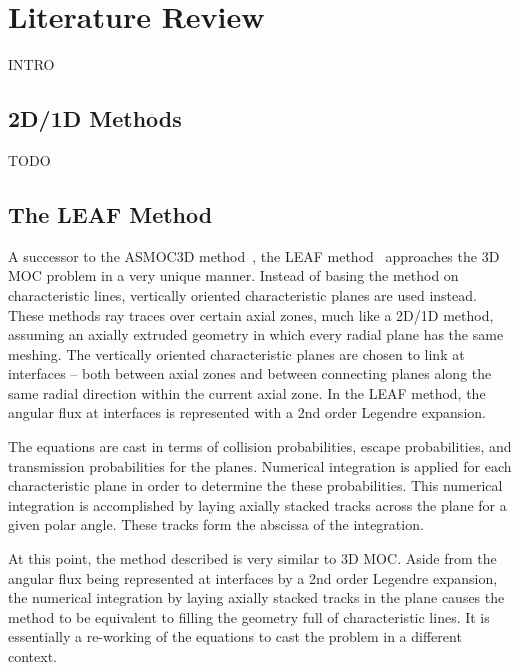 \chapter{Literature Review}
\label{chap:literature-review}

INTRO

\section{2D/1D Methods}
\label{sec:2d_1d}
TODO

\section{The LEAF Method}
\label{sec:leaf}

A successor to the ASMOC3D method~\cite{pre_leaf}, the LEAF method~\cite{leaf_init, leaf_method} approaches the 3D \ac{MOC} problem in a very unique manner. Instead of basing the method on characteristic lines, vertically oriented characteristic planes are used instead. These methods ray traces over certain axial zones, much like a 2D/1D method, assuming an axially extruded geometry in which every radial plane has the same meshing. The vertically oriented characteristic planes are chosen to link at interfaces -- both between axial zones and between connecting planes along the same radial direction within the current axial zone. In the LEAF method, the angular flux at interfaces is represented with a 2nd order Legendre expansion.

The equations are cast in terms of collision probabilities, escape probabilities, and transmission probabilities for the planes. Numerical integration is applied for each characteristic plane in order to determine the these probabilities. This numerical integration is accomplished by laying axially stacked tracks across the plane for a given polar angle. These tracks form the abscissa of the integration. 

At this point, the method described is very similar to 3D \ac{MOC}. Aside from the angular flux being represented at interfaces by a 2nd order Legendre expansion, the numerical integration by laying axially stacked tracks in the plane causes the method to be equivalent to filling the geometry full of characteristic lines. It is essentially a re-working of the equations to cast the problem in a different context.

